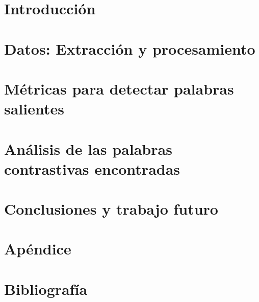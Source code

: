 \documentclass[11pt,a4paper]{tesis}
\begin{document}
\def\titulo{Licenciatura\xspace}

\def\autor{Damián Eliel Aleman}
\def\tituloTesis{Hacia un método para detectar léxico contrastivo}
\def\runtitulo{\tituloTesis}
\def\director{Juan Manuel Pérez y Santiago Kalinowski}
\def\codirector{Agustín Gravano}
\def\lugar{Buenos Aires, 2017}
%



\frontmatter
\pagestyle{empty}




\tableofcontents

\mainmatter
\pagestyle{headings}


\chapter{Introducción}
\label{ch:introduccion}


\chapter{Datos: Extracción y procesamiento}
\label{ch:datos}


\chapter{Métricas para detectar palabras salientes}
\label{ch:metricas}


\chapter{Análisis de las palabras contrastivas encontradas}
\label{ch:validacion}


\chapter{Conclusiones y trabajo futuro}
\label{ch:conclusiones}


\chapter{Apéndice}
\label{ch:apendice}



\chapter{Bibliografía}
\backmatter



\end{document}
